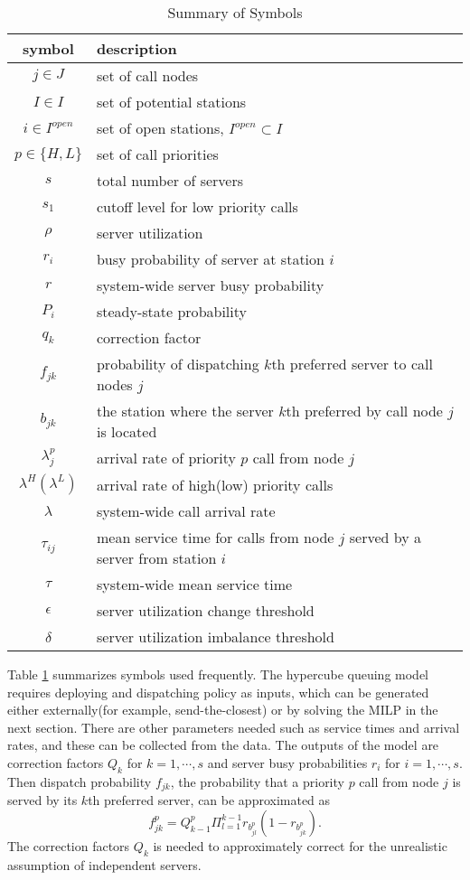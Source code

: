 \documentclass{article}
\begin{document}
\begin{table}
\centering
\begin{tabular}{c l}
\hline
\hline
\textbf{symbol} & \textbf{description} \\
\hline
 $j \in J$	& set of call nodes \\
 $I \in I$ & set of potential stations\\
 $i \in I^{open}$ & set of open stations, $I^{open} \subset I$ \\
 $p \in \{H,L\}$ & set of call priorities \\
 $ s $ 	& total number of servers \\
 $ s_1 $& cutoff level for low priority calls\\
 $\rho$ & server utilization \\
 $ r_i$ & busy probability of server at station $i$ \\
 $ r $ 	& system-wide server busy probability \\
 $P_i$ 	& steady-state probability \\
 $q_k$ 	& correction factor \\
 $f_{jk}$ & probability of dispatching $k$th preferred server to call nodes $j$ \\
 $b_{jk}$ & the station where the server $k$th preferred by call node $j$ is located \\
 $\lambda_{j}^p$ & arrival rate of priority $p$ call from node $j$\\
 $\lambda^H(\lambda^L)$ & arrival rate of high(low) priority calls\\
 $\lambda$ & system-wide call arrival rate\\
 $\tau_{ij}$ & mean service time for calls from node $j$ served by a server from station $i$ \\
 $\tau$ & system-wide mean service time\\
 $\epsilon$ & server utilization change threshold\\
 $\delta$ & server utilization imbalance threshold\\
\hline
\end{tabular}
\caption{Summary of Symbols}
\label{table:symbol}
\end{table}


Table \ref{table:symbol} summarizes symbols used frequently. The hypercube queuing model requires deploying and dispatching policy as inputs, which can be generated either externally(for example, send-the-closest) or by solving the MILP in the next section. There are other parameters needed such as service times and arrival rates, and these can be collected from the data. The outputs of the model are correction factors $Q_k$ for $k=1,\cdots,s$ and server busy probabilities $r_i$ for $i=1,\cdots,s$. Then dispatch probability $f_{jk}$, the probability that a priority $p$ call from node $j$ is served by its $k$th preferred server, can be approximated as
\begin{equation} \label{dispatchprobability}
f^p_{jk} = Q^p_{k-1} \Pi_{l=1}^{k-1} r_{b^p_{jl}}(1-r_{b^p_{jk}}).
\end{equation}
The correction factors $Q_k$ is needed to approximately correct for the unrealistic assumption of independent servers.
\end{document}
